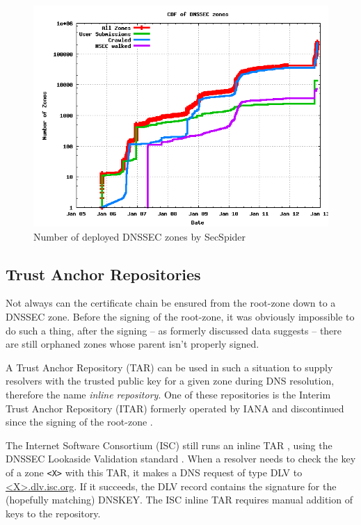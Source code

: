 \documentclass[a4paper,twocolumn]{scrartcl}
\begin{document}
\begin{figure}
  \includegraphics[width=\linewidth]{dnssec-growth}
  \caption{Number of deployed DNSSEC zones by
    SecSpider \cite{secspider}}
  \label{fig:dnssec-growth}
\end{figure}

\subsection{Trust Anchor Repositories}
Not always can the certificate chain be ensured from the root-zone
down to a DNSSEC zone. Before the signing of the root-zone, it was
obviously impossible to do such a thing, after the signing -- as
formerly discussed data suggests -- there are still orphaned zones
whose parent isn't properly signed.

A Trust Anchor Repository (TAR) can be used in such a situation to
supply resolvers with the trusted public key for a given zone during
DNS resolution, therefore the name \emph{inline repository}. One of
these repositories is the Interim Trust Anchor Repository (ITAR)
formerly operated by IANA and discontinued since the signing of the
root-zone \cite{itar}.

The Internet Software Consortium (ISC) still runs an inline TAR
\cite{iscDlv}, using the DNSSEC Lookaside Validation standard
\cite{RFC5074}. When a resolver needs to check the key of a zone
\verb|<X>| with this TAR, it makes a DNS request of type DLV to 
\url{<X>.dlv.isc.org}. If it succeeds, the DLV record contains the
signature for the (hopefully matching) DNSKEY. The ISC inline TAR
requires manual addition of keys to the repository.
\end{document}
